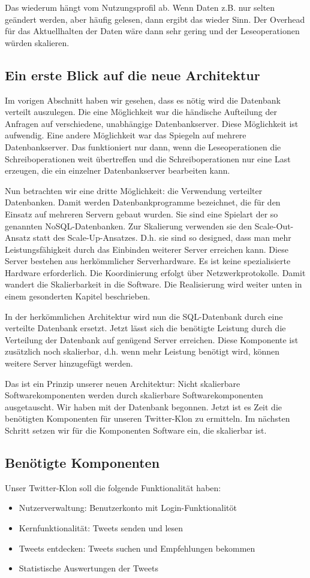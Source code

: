 \begin{itemize}
Das wiederum hängt vom Nutzungsprofil ab. Wenn Daten z.B. nur selten geändert werden, aber häufig gelesen,
dann ergibt das wieder Sinn. Der Overhead für das Aktuellhalten der Daten wäre dann sehr gering und
der Leseoperationen würden skalieren. 

\subsection{Ein erste Blick auf die neue Architektur}
Im vorigen Abschnitt haben wir gesehen, dass es nötig wird die Datenbank verteilt auszulegen. Die eine Möglichkeit war
die händische Aufteilung der Anfragen auf verschiedene, unabhängige Datenbankserver. Diese Möglichkeit ist aufwendig.
Eine andere Möglichkeit war das Spiegeln auf mehrere Datenbankserver. Das funktioniert nur dann, wenn die Leseoperationen
die Schreiboperationen weit übertreffen und die Schreiboperationen nur eine Last erzeugen, die ein einzelner Datenbankserver
bearbeiten kann.

Nun betrachten wir eine dritte Möglichkeit: die Verwendung verteilter Datenbanken. Damit werden Datenbankprogramme
bezeichnet, die für den Einsatz auf mehreren Servern gebaut wurden. Sie sind eine Spielart der so genannten NoSQL-Datenbanken.
Zur Skalierung verwenden sie den Scale-Out-Ansatz statt des Scale-Up-Ansatzes. D.h. sie sind so designed, dass man mehr
Leistungsfähigkeit durch das Einbinden weiterer Server erreichen kann. Diese Server bestehen aus herkömmlicher Serverhardware.
Es ist keine spezialisierte Hardware erforderlich. Die Koordinierung erfolgt über Netzwerkprotokolle. Damit wandert die
Skalierbarkeit in die Software. Die Realisierung wird weiter unten in einem gesonderten Kapitel beschrieben.

In der herkömmlichen Architektur wird nun die SQL-Datenbank durch eine verteilte Datenbank ersetzt. Jetzt lässt sich
die benötigte Leistung durch die Verteilung der Datenbank auf genügend Server erreichen. Diese Komponente ist
zusätzlich noch skalierbar, d.h. wenn mehr Leistung benötigt wird, können weitere Server hinzugefügt werden.

Das ist ein Prinzip unserer neuen Architektur: Nicht skalierbare Softwarekomponenten werden durch skalierbare
Softwarekomponenten ausgetauscht. Wir haben mit der Datenbank begonnen. Jetzt ist es Zeit die benötigten Komponenten
für unseren Twitter-Klon zu ermitteln. Im nächsten Schritt setzen wir für die Komponenten Software ein, die skalierbar ist.

\subsection{Benötigte Komponenten}
Unser Twitter-Klon soll die folgende Funktionalität haben:
\begin{itemize}
  \item Nutzerverwaltung: Benutzerkonto mit Login-Funktionalitöt
  \item Kernfunktionalität: Tweets senden und lesen
  \item Tweets entdecken: Tweets suchen und Empfehlungen bekommen
  \item Statistische Auswertungen der Tweets
\end{itemize}


\end{itemize}
